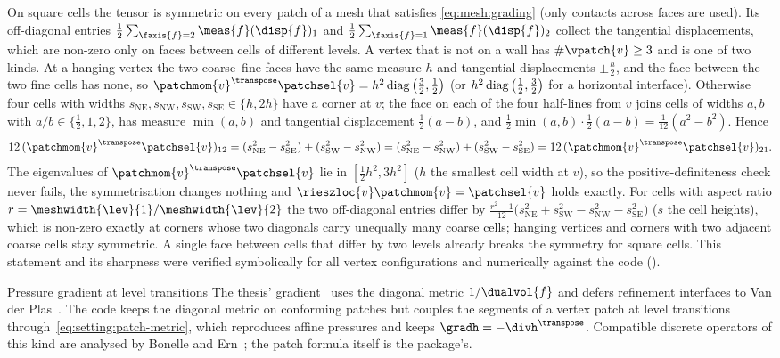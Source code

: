 On square cells the tensor is symmetric on every patch of a mesh that satisfies
\cref{eq:mesh:grading} (only contacts across faces are used). Its off-diagonal
entries $\frac12\sum_{\faxis{f}=2}\meas{f}(\disp{f})_1$ and
$\frac12\sum_{\faxis{f}=1}\meas{f}(\disp{f})_2$ collect the tangential
displacements, which are non-zero only on faces between cells of different
levels. A vertex that is not on a wall has $\#\vpatch{v}\ge3$ and is one of two
kinds. At a hanging vertex the two coarse--fine faces have the same measure $h$
and tangential displacements $\pm\frac h2$, and the face between the two fine
cells has none, so $\patchmom{v}^{\transpose}\patchsel{v}=h^2\diag{\frac32,\frac12}$
(or $h^2\operatorname{diag}\left( \frac12,\frac32 \right)$ for a horizontal interface). Otherwise four cells
with widths $s_{\mathrm{NE}},s_{\mathrm{NW}},s_{\mathrm{SW}},s_{\mathrm{SE}}\in\{h,2h\}$
have a corner at $v$; the face on each of the four half-lines from $v$ joins cells
of widths $a,b$ with $a/b\in\{\frac12,1,2\}$, has measure $\min(a,b)$ and
tangential displacement $\frac12(a-b)$, and
$\frac12\min(a,b)\cdot\frac12(a-b)=\frac1{12}(a^2-b^2)$. Hence
\begin{equation*}
  12\,(\patchmom{v}^{\transpose}\patchsel{v})_{12}
  =(s_{\mathrm{NE}}^2-s_{\mathrm{SE}}^2)+(s_{\mathrm{SW}}^2-s_{\mathrm{NW}}^2)
  =(s_{\mathrm{NE}}^2-s_{\mathrm{NW}}^2)+(s_{\mathrm{SW}}^2-s_{\mathrm{SE}}^2)
  =12\,(\patchmom{v}^{\transpose}\patchsel{v})_{21}.
\end{equation*}
The eigenvalues of $\patchmom{v}^{\transpose}\patchsel{v}$ lie in $[\frac12h^2,3h^2]$
($h$ the smallest cell width at $v$), so the positive-definiteness check never
fails, the symmetrisation changes nothing and $\rieszloc{v}\patchmom{v}=\patchsel{v}$
holds exactly. For cells with aspect ratio $r=\meshwidth{\lev}{1}/\meshwidth{\lev}{2}$
the two off-diagonal entries differ by
$\frac{r^2-1}{12}\big(s_{\mathrm{NE}}^2+s_{\mathrm{SW}}^2-s_{\mathrm{NW}}^2-s_{\mathrm{SE}}^2\big)$
($s$ the cell heights), which is non-zero exactly at corners whose two diagonals
carry unequally many coarse cells; hanging vertices and corners with two adjacent
coarse cells stay symmetric. A single face between cells that differ by two levels
already breaks the symmetry for square cells. This statement and its sharpness
were verified symbolically for all vertex configurations and numerically against
the code ().

\begin{deviation}{Pressure gradient at level transitions}
The thesis' gradient~ uses the diagonal metric
$1/\dualvol{f}$ and defers refinement interfaces to Van der
Plas~\cite{vanderplas2017}. The code keeps the diagonal metric on conforming
patches but couples the segments of a vertex patch at level transitions
through~\cref{eq:setting:patch-metric}, which reproduces affine pressures and
keeps $\gradh=-\divh^{\transpose}$. Compatible discrete operators of this kind
are analysed by Bonelle and Ern~\cite{bonelle2014}; the patch formula itself
is the package's.
\end{deviation}

